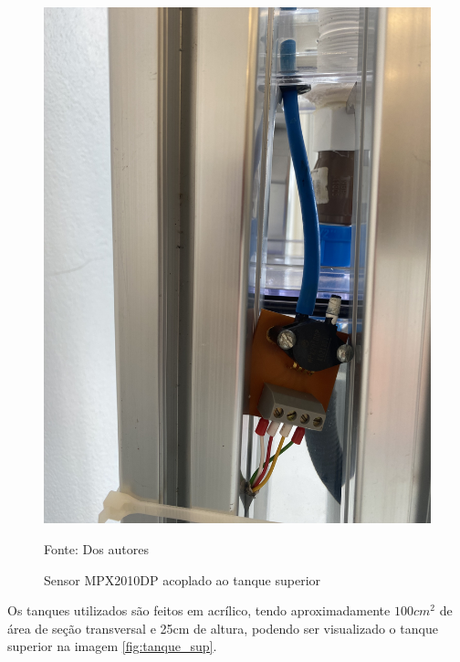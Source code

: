 \begin{figure}[H]
        \centering\footnotesize
        \caption{Sensor MPX2010DP acoplado ao tanque superior}
        \begin{center}
            \includegraphics[scale=0.1]{imagens/sensor.jpg}
        \end{center}
        \label{fig:sensor}
        \par Fonte: Dos autores
    \end{figure}
    
Os tanques utilizados são feitos em acrílico, tendo aproximadamente ${100cm^2}$ de área de seção transversal e 25cm de altura, podendo ser visualizado o tanque superior na imagem \ref{fig:tanque_sup}.

